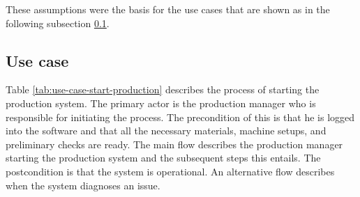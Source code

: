 These assumptions were the basis for the use cases that are shown as in the following subsection \ref{sec:use_case}.

\subsection{Use case}
\label{sec:use_case}

Table \ref{tab:use-case-start-production} describes the process of starting the production system. The primary actor is the production manager who is responsible for initiating the process. The precondition of this is that he is logged into the software and that all the necessary materials, machine setups, and preliminary checks are ready. The main flow describes the production manager starting the production system and the subsequent steps this entails. The postcondition is that the system is operational. An alternative flow describes when the system diagnoses an issue.

